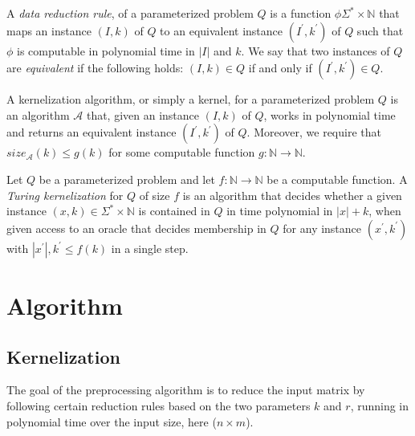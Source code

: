 \documentclass[a4paper]{article}
\begin{document}
\begin{theoremdefinition}
    A \textit{data reduction rule}, of a parameterized problem $Q$ is a function
    $\phi \Sigma^* \times \mathbb{N}$ that maps an instance $(I,k)$ of $Q$ to an equivalent
    instance $(I^\prime, k^\prime)$ of $Q$ such that $\phi$ is computable in polynomial time
    in $|I|$ and $k$. We say that two instances of $Q$ are \textit{equivalent} if the following
    holds: $(I,k) \in Q$ if and only if $(I^\prime, k^\prime) \in Q$.
    \cite{fomin_golovach_panolan_2020}
\end{theoremdefinition}

\begin{theoremdefinition}
    A kernelization algorithm, or simply a kernel, for a parameterized problem $Q$
    is an algorithm $\mathcal{A}$ that, given an instance $(I,k)$ of $Q$, works in polynomial
    time and returns an equivalent instance $(I^\prime, k^\prime)$ of $Q$. Moreover, we require
    that $size_{\mathcal{A}}(k) \leq g(k)$ for some computable function
    $g: \mathbb{N} \rightarrow \mathbb{N}$. \cite[p.~18]{param_algo_book}
\end{theoremdefinition}

\begin{theoremdefinition}
    Let $Q$ be a parameterized problem and let $f:\mathbb{N} \rightarrow \mathbb{N} $
    be a computable function. A \textit{Turing kernelization} for $Q$ of size $f$ is an
    algorithm that decides whether a given instance $(x,k) \in \Sigma^* \times \mathbb{N}$
    is contained in $Q$ in time polynomial in $|x|+k$, when given access to an oracle
    that decides membership in $Q$ for any instance $(x^\prime, k^\prime)$ with
    $|x^\prime|,k^\prime \leq f(k)$ in a single step. \cite[p.~314]{param_algo_book}
\end{theoremdefinition}

%
%

\newpage

\section{Algorithm}

\subsection{Kernelization}
The goal of the preprocessing algorithm is to reduce the input matrix by following certain reduction rules
based on the two parameters $k$ and $r$, running in polynomial time over the input size, here ($n \times m$).
\end{document}
